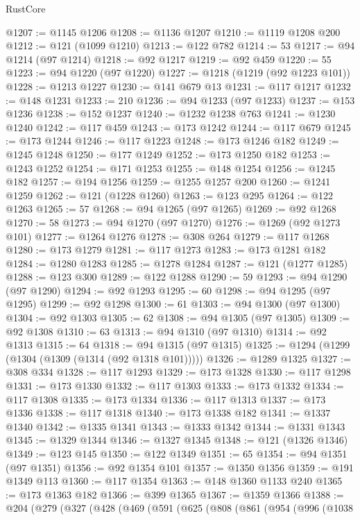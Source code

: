 \begin{lexlean}{RustCore}
\begin{coremodule}
@1207 := @1145 @1206
@1208 := @1136 @1207
@1210 := @1119 @1208 @200
@1212 := @121 (@1099 @1210)
@1213 := @122 @782
@1214 := 53
@1217 := @94 @1214 (@97 @1214)
@1218 := @92 @1217
@1219 := @92 @459
@1220 := 55
@1223 := @94 @1220 (@97 @1220)
@1227 := @1218 (@1219 (@92 @1223 @101))
@1228 := @1213 @1227
@1230 := @141 @679 @13
@1231 := @117 @1217
@1232 := @148 @1231
@1233 := 210
@1236 := @94 @1233 (@97 @1233)
@1237 := @153 @1236
@1238 := @152 @1237
@1240 := @1232 @1238 @763
@1241 := @1230 @1240
@1242 := @117 @459
@1243 := @173 @1242
@1244 := @117 @679
@1245 := @173 @1244
@1246 := @117 @1223
@1248 := @173 @1246 @182
@1249 := @1245 @1248
@1250 := @177 @1249
@1252 := @173 @1250 @182
@1253 := @1243 @1252
@1254 := @171 @1253
@1255 := @148 @1254
@1256 := @1245 @182
@1257 := @194 @1256
@1259 := @1255 @1257 @200
@1260 := @1241 @1259
@1262 := @121 (@1228 @1260)
@1263 := @123 @295
@1264 := @122 @1263
@1265 := 57
@1268 := @94 @1265 (@97 @1265)
@1269 := @92 @1268
@1270 := 58
@1273 := @94 @1270 (@97 @1270)
@1276 := @1269 (@92 @1273 @101)
@1277 := @1264 @1276
@1278 := @308 @264
@1279 := @117 @1268
@1280 := @173 @1279
@1281 := @117 @1273
@1283 := @173 @1281 @182
@1284 := @1280 @1283
@1285 := @1278 @1284
@1287 := @121 (@1277 @1285)
@1288 := @123 @300
@1289 := @122 @1288
@1290 := 59
@1293 := @94 @1290 (@97 @1290)
@1294 := @92 @1293
@1295 := 60
@1298 := @94 @1295 (@97 @1295)
@1299 := @92 @1298
@1300 := 61
@1303 := @94 @1300 (@97 @1300)
@1304 := @92 @1303
@1305 := 62
@1308 := @94 @1305 (@97 @1305)
@1309 := @92 @1308
@1310 := 63
@1313 := @94 @1310 (@97 @1310)
@1314 := @92 @1313
@1315 := 64
@1318 := @94 @1315 (@97 @1315)
@1325 := @1294 (@1299 (@1304 (@1309 (@1314 (@92 @1318 @101)))))
@1326 := @1289 @1325
@1327 := @308 @334
@1328 := @117 @1293
@1329 := @173 @1328
@1330 := @117 @1298
@1331 := @173 @1330
@1332 := @117 @1303
@1333 := @173 @1332
@1334 := @117 @1308
@1335 := @173 @1334
@1336 := @117 @1313
@1337 := @173 @1336
@1338 := @117 @1318
@1340 := @173 @1338 @182
@1341 := @1337 @1340
@1342 := @1335 @1341
@1343 := @1333 @1342
@1344 := @1331 @1343
@1345 := @1329 @1344
@1346 := @1327 @1345
@1348 := @121 (@1326 @1346)
@1349 := @123 @145
@1350 := @122 @1349
@1351 := 65
@1354 := @94 @1351 (@97 @1351)
@1356 := @92 @1354 @101
@1357 := @1350 @1356
@1359 := @191 @1349 @113
@1360 := @117 @1354
@1363 := @148 @1360 @1133 @240
@1365 := @173 @1363 @182
@1366 := @399 @1365
@1367 := @1359 @1366
@1388 := @204
    (@279
      (@327
        (@428
          (@469
            (@591
              (@625
                (@808
                  (@861
                    (@954
                      (@996
                        (@1038

\end{coremodule}
\end{lexlean}
